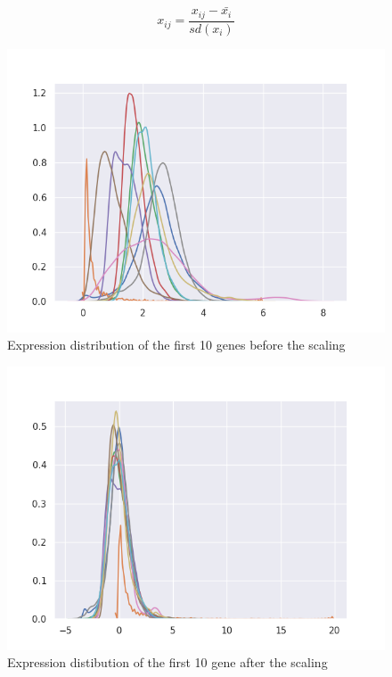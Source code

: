 \begin{equation}
    x_{ij} = \frac{x_{ij}-\bar{x_{i}}}{sd(x_{i})}
    \label{eq:std}
\end{equation}

\begin{figure}
    \centering
    \includegraphics[width=0.8\linewidth]{images/norm_expr_genes.png}
    \caption[Expression before scaling]{Expression distribution of the first 10 genes before the scaling}
    \label{fig:norm_expr_genes}
\end{figure}

\begin{figure}
    \centering
    \includegraphics[width=0.8\linewidth]{images/scaled_expr_genes.png}
    \caption[Expression after scaling]{Expression distibution of the first 10 gene after the scaling}
    \label{fig:scaled_expr_genes}
\end{figure}

\newpage
